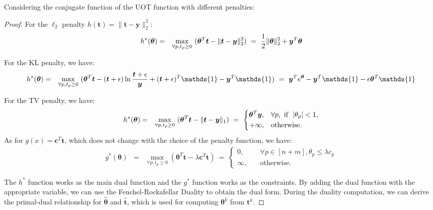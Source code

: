 \documentclass[11pt]{article}
\newcommand{\one}{\mathds{1}}
\renewcommand{\vec}[1]{\bm{#1}}
\begin{document}
Considering the conjugate function of the UOT function with different penalties:
\begin{proof}
For the $\ell_2$ penalty $h(\vec t) = \|\vec t-\vec y\|_2^2$:
\begin{eqnarray}
h^*(\vec \theta) &=&\max _{\forall p, t_p \geq 0} \ (\vec \theta^{T}\vec t- \|\vec t - \vec y\|^2_2
)\ =\ \frac{1}{2}\|\vec\theta\|_2^2 +\vec y^{T}\vec\theta\notag\\
\end{eqnarray}
%


For the KL penalty, we have:
\begin{eqnarray}
h^*(\vec \theta) &=&\max _{\forall p, t_p \geq 0} \ (\vec \theta^{T}\vec t-(\vec t +\epsilon)\ln \frac{\vec t + \epsilon}{\vec y}+(\vec t +\epsilon)^{T} \one-\vec y^{T} \one)
\ =\ \vec y^{T} e^{\vec \theta} -\vec y^{T} \one -\epsilon\vec\theta^{T}\one\notag\\
\end{eqnarray}
%

For the TV penalty, we have:
\begin{eqnarray}
h^*(\vec \theta) &=&\max _{\forall p, t_p \geq 0} \ (\vec \theta^{T}\vec t- \|\vec t - \vec y\|_1)
\ =\ \left\{
\begin{aligned}
      \vec{\theta}^{T}\vec{y},\quad& \forall p,\text{ if }\  |\theta_p| < 1, \\
     +\infty,\quad & \text{otherwise}.
\end{aligned}
\right.\notag\\
\end{eqnarray}
%
As for $g(x) = \vec c^{T}\vec t$, which does not change with the choice of the penalty function, we have:
\begin{eqnarray}
g^*(\vec\theta) &=&\max _{\forall p, t_p \geq 0} (\vec \theta^{T} \vec t-\lambda \vec c^{T} \vec t)
\ =\ \left\{
\begin{aligned}
0 ,\quad& \forall p \in [n+m], \theta_p \leq \lambda c_p\\
\infty, \quad& \text{otherwise}.
\end{aligned}
\right.
\label{eq_appendix:uotdual}
\end{eqnarray}




The $h^*$ function works as the main dual function and the $g^*$ function works as the constraints. By adding the dual function with the appropriate variable, we can use the Fenchel-Rockafellar Duality to obtain the dual form. During the duality computation, we can derive the primal-dual relationship for $\hat{\vec{\theta}}$ and $\hat{\vec{t}}$, which is used for computing $\vec{\theta}^{k}$ from $\vec{t}^{k}$.\end{proof}
\end{document}
